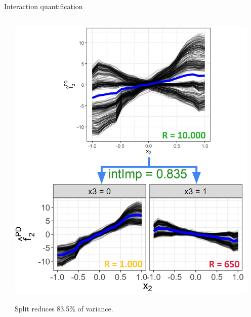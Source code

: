 \begin{frame}{Interaction quantification}
\begin{columns}[T, totalwidth=\textwidth]
\begin{column}{0.59\textwidth}
\begin{center}
    \end{center}
        \end{column}
    \pause
        \begin{column}{0.4\textwidth}
     \centering
    \includegraphics[width = 0.95\textwidth]{figure/sim1_fake.png}
    
    Split reduces 83.5\% of variance.
        \end{column}
    \end{columns}
    
    \end{frame}
    

